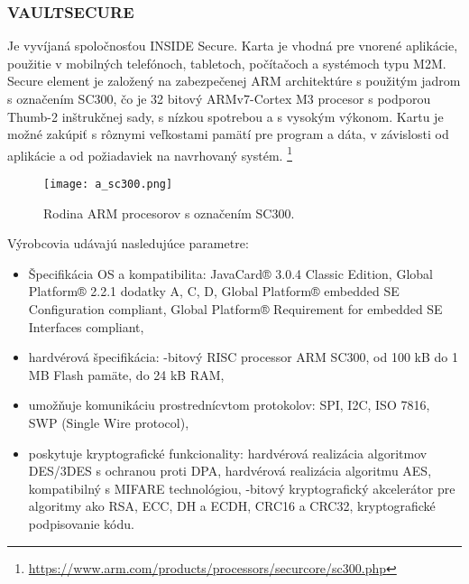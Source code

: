 \documentclass[12pt,a4wide,oneside,openright]{report}
\begin{document}
\subsubsection{VAULTSECURE} \label{s_sd_vault}
Je vyvíjaná spoločnosťou INSIDE Secure. Karta je vhodná pre vnorené aplikácie, použitie v mobilných telefónoch, tabletoch, počítačoch a systémoch typu M2M. 
Secure element je založený na zabezpečenej ARM architektúre s použitým jadrom s označením SC300, čo je 32 bitový ARMv7-Cortex M3 procesor s podporou Thumb-2 inštrukčnej sady, s nízkou spotrebou a s vysokým výkonom. Kartu je možné zakúpiť s rôznymi veľkostami pamätí pre program a dáta, v závislosti od aplikácie a od požiadaviek na navrhovaný systém. \footnote{\url{https://www.arm.com/products/processors/securcore/sc300.php}}
\begin{figure*}[h]
	\centering
	\texttt{[image: a\_sc300.png]}
	\caption{Rodina ARM procesorov s označením SC300. \cite{sc300}}
	\label{f:o_sc300}
\end{figure*}
Výrobcovia udávajú nasledujúce parametre\cite{vaultsecure}:
\singlespacing
\begin{itemize}
\item Špecifikácia OS a kompatibilita:
\subitem JavaCard® 3.0.4 Classic Edition,
\subitem Global Platform® 2.2.1 dodatky A, C, D,
\subitem Global Platform® embedded SE Configuration compliant,
\subitem Global Platform® Requirement for embedded SE Interfaces compliant,
\item hardvérová špecifikácia:
-bitový RISC processor ARM SC300,
\subitem od 100 kB do 1 MB Flash pamäte,
\subitem do 24 kB RAM,
\item umožňuje komunikáciu prostrednícvtom protokolov:
\subitem SPI,
\subitem I2C,
\subitem ISO 7816,
\subitem SWP (Single Wire protocol),
\item poskytuje kryptografické funkcionality:
\subitem hardvérová realizácia algoritmov DES/3DES s ochranou proti DPA,
\subitem hardvérová realizácia algoritmu AES,
\subitem kompatibilný s MIFARE technológiou,
-bitový kryptografický akcelerátor pre algoritmy ako RSA, ECC, DH a ECDH,
\subitem CRC16 a CRC32,
\subitem kryptografické podpisovanie kódu.
\end{itemize}
\onehalfspacing
\end{document}
